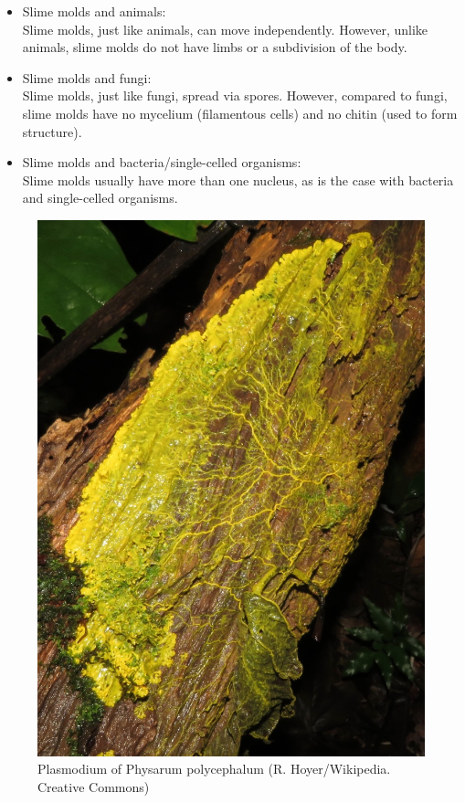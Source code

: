 \begin{itemize}
\item Slime molds and animals: \\
Slime molds, just like animals, can move independently. However, unlike animals, slime molds do not have limbs or a subdivision of the body.
\item Slime molds and fungi: \\
Slime molds, just like fungi, spread via spores. However, compared to fungi, slime molds have no mycelium (filamentous cells) and no chitin (used to form structure).
\item Slime molds and bacteria/single-celled organisms: \\
Slime molds usually have more than one nucleus, as is the case with bacteria and single-celled organisms.
\end{itemize}

\begin{figure}[!htp]
	\centering
	\includegraphics[scale=0.45]{images/Physarum_polycephalum_(3).jpg}
	\caption[Plasmodium of Physarum polycephalum]{Plasmodium of Physarum polycephalum (R. Hoyer/Wikipedia. Creative Commons)}
	\label{fig:plasmodianpp}
\end{figure}

